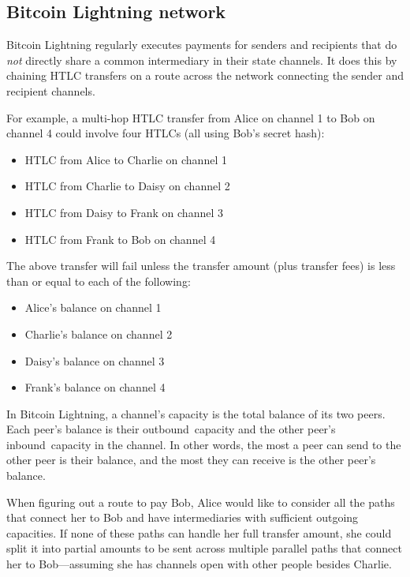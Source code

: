 \documentclass[11pt,a4paper,oneside]{article}
\begin{document}
\begin{multicols}{2}
\section{Bitcoin Lightning network}%
\label{h:bitcoin-lightning-network}

Bitcoin Lightning regularly executes payments for senders and recipients that do \emph{not} directly share a common intermediary in their state channels.
It does this by chaining HTLC transfers on a route across the network connecting the sender and recipient channels.

For example, a multi-hop HTLC transfer from Alice on channel 1 to Bob on channel 4 could involve four HTLCs (all using Bob's secret hash):
\begin{itemize}
  \item HTLC from Alice to Charlie on channel 1
  \item HTLC from Charlie to Daisy on channel 2
  \item HTLC from Daisy to Frank on channel 3
  \item HTLC from Frank to Bob on channel 4
\end{itemize}

The above transfer will fail unless the transfer amount (plus transfer fees) is less than or equal to each of the following:
\begin{itemize}
  \item Alice's balance on channel 1
  \item Charlie's balance on channel 2
  \item Daisy's balance on channel 3
  \item Frank's balance on channel 4
\end{itemize}

In Bitcoin Lightning, a channel's capacity is the total balance of its two peers.
Each peer's balance is their outbound~capacity and the other peer's inbound~capacity in the channel.
In other words, the most a peer can send to the other peer is their balance,  and the most they can receive is the other peer's balance.

When figuring out a route to pay Bob, Alice would like to consider all the paths that connect her to Bob and have intermediaries with sufficient outgoing capacities.
If none of these paths can handle her full transfer amount, she could split it into partial amounts to be sent across multiple parallel paths that connect her to Bob---assuming she has channels open with other people besides Charlie.


\end{multicols}
\end{document}
